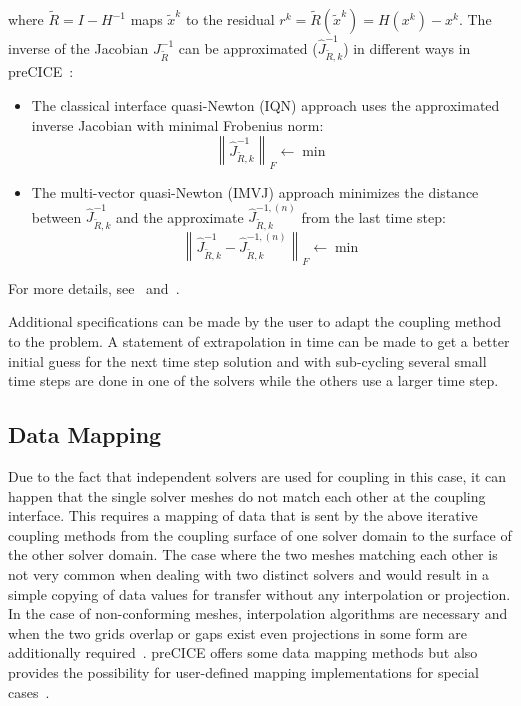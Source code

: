    where $\tilde{R} = I-H^{-1}$ maps $\tilde{x}^k$ to the residual $r^k=\tilde{R}(\tilde{x}^k)=H(x^k)-x^k$. The inverse of the Jacobian $J_{\tilde{R}}^{-1}$ can be approximated ($\hat{J}_{\tilde{R},k}^{-1}$) in different ways in preCICE~\cite{bungartz2015fully}:
   \begin{itemize}
   	\item The classical interface quasi-Newton (IQN) approach uses the approximated inverse Jacobian with minimal Frobenius norm:
   	\begin{equation}
   	\left\| \hat{J}_{\tilde{R},k}^{-1} \right\|_F \leftarrow \min
   	\end{equation}
   	\item The multi-vector quasi-Newton (IMVJ) approach minimizes the distance between $\hat{J}_{\tilde{R},k}^{-1}$ and the approximate $\hat{J}_{\tilde{R},k}^{-1,(n)}$ from the last time step:
   	\begin{equation}
   	\left\| \hat{J}_{\tilde{R},k}^{-1} - \hat{J}_{\tilde{R},k}^{-1,(n)}\right\|_F \leftarrow \min
   	\end{equation}
   \end{itemize}
   For more details, see~\cite{bungartz2015fully} and~\cite{gatzhammer2015efficient}.
   
   Additional specifications can be made by the user to adapt the coupling method to the problem. A statement of extrapolation in time can be made to get a better initial guess for the next time step solution and with sub-cycling several small time steps are done in one of the solvers while the others use a larger time step.
  

 \subsection{Data Mapping} \label{sec:Coupl-DataMapping}
  Due to the fact that independent solvers are used for coupling in this case, it can happen that the single solver meshes do not match each other at the coupling interface. This requires a mapping of data that is sent by the above iterative coupling methods from the coupling surface of one solver domain to the surface of the other solver domain. The case where the two meshes matching each other is not very common when dealing with two distinct solvers and would result in a simple copying of data values for transfer without any interpolation or projection. In the case of non-conforming meshes, interpolation algorithms are necessary and when the two grids overlap or gaps exist even projections in some form are additionally required~\cite{gatzhammer2015efficient}. preCICE offers some data mapping methods but also provides the possibility for user-defined mapping implementations for special cases~\cite{bungartz2015fully}.
